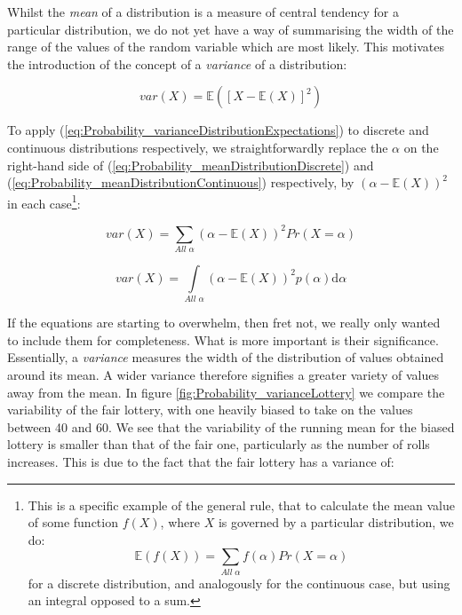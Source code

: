 \documentclass[11pt,fullpage]{book}
\begin{document}
Whilst the \textit{mean} of a distribution is a measure of central tendency for a particular distribution, we do not yet have a way of summarising the width of the range of the values of the random variable which are most likely. This motivates the introduction of the concept of a \textit{variance} of a distribution:

\begin{equation}\label{eq:Probability_varianceDistributionExpectations}
var(X) = \mathbb{E}\left(\left[X-\mathbb{E}(X)\right]^2\right)
\end{equation}

To apply (\ref{eq:Probability_varianceDistributionExpectations}) to discrete and continuous distributions respectively, we straightforwardly replace the $\alpha$ on the right-hand side of (\ref{eq:Probability_meanDistributionDiscrete}) and (\ref{eq:Probability_meanDistributionContinuous}) respectively, by $(\alpha-\mathbb{E}(X))^2$ in each case\footnote{This is a specific example of the general rule, that to calculate the mean value of some function $f(X)$, where $X$ is governed by a particular distribution, we do: \begin{equation}
\mathbb{E}(f(X)) = \sum\limits_{All\; \alpha} f(\alpha) Pr(X=\alpha)
\end{equation}
for a discrete distribution, and analogously for the continuous case, but using an integral opposed to a sum.}:

\begin{equation}\label{eq:Probability_varianceDistributionDiscrete}
var(X) = \sum\limits_{All\; \alpha} (\alpha-\mathbb{E}(X))^2 Pr(X=\alpha)
\end{equation}

\begin{equation}\label{eq:Probability_varianceDistributionContinuous}
var(X) = \int\limits_{All\; \alpha} (\alpha-\mathbb{E}(X))^2 p(\alpha)\mathrm{d}\alpha
\end{equation}

If the equations are starting to overwhelm, then fret not, we really only wanted to include them for completeness. What is more important is their significance. Essentially, a \textit{variance} measures the width of the distribution of values obtained around its mean. A wider variance therefore signifies a greater variety of values away from the mean. In figure \ref{fig:Probability_varianceLottery} we compare the variability of the fair lottery, with one heavily biased to take on the values between 40 and 60. We see that the variability of the running mean for the biased lottery is smaller than that of the fair one, particularly as the number of rolls increases. This is due to the fact that the fair lottery has a variance of:
\end{document}
